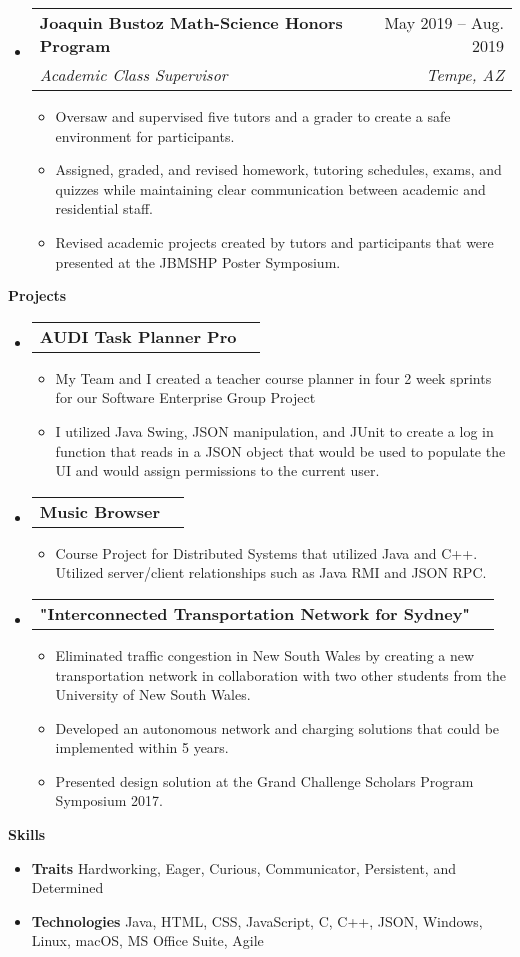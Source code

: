 \documentclass[letterpaper,12pt]{article}[leftmargin=*]
\makeatletter
\def \entryspacing {-0pt}
\renewcommand{\section}[2]{\vspace{5pt}
  \colorbox{secondary}{\color{white}\raggedbottom\normalsize\textbf{{#1}{\hspace{7pt}#2}}}
}
\newcommand{\resumeEntryStart}{\begin{itemize}[leftmargin=2.5mm]}
\newcommand{\resumeEntryEnd}{\end{itemize}\vspace{\entryspacing}}
\newcommand{\resumeItemListStart}{\begin{itemize}[leftmargin=4.5mm]}
\newcommand{\resumeItemListEnd}{\end{itemize}}
\newcommand{\resumeItem}[1]{
  \item\small{
    {#1 \vspace{-2pt}}
  }
}
\newcommand{\resumeEntryTSDL}[4]{
  \vspace{-1pt}\item[]
    \begin{tabularx}{0.97\textwidth}{X@{\hspace{60pt}}r}
      \textbf{\color{primary}#1} & {\firabook\color{accent}\small#2} \\
      \textit{\color{accent}\small#3} & \textit{\color{accent}\small#4} \\
    \end{tabularx}\vspace{-6pt}
}
\newcommand{\resumeEntryTD}[2]{
  \vspace{-1pt}\item[]
    \begin{tabularx}{0.97\textwidth}{X@{\hspace{60pt}}r}
      \textbf{\color{primary}#1} & {\firabook\color{accent}\small#2} \\
    \end{tabularx}\vspace{-6pt}
}
\newcommand{\resumeEntryS}[2]{
  \item[]\small{
    \textbf{\color{primary}#1 }{ #2 \vspace{-6pt}}
  }
}
\makeatother
\begin{document}
  \resumeEntryStart
    \resumeEntryTSDL
      {Joaquin Bustoz Math-Science Honors Program}{May 2019 -- Aug. 2019}
      {Academic Class Supervisor}{Tempe, AZ}
    \resumeItemListStart
      \resumeItem {Oversaw and supervised five tutors and a grader to create a safe environment for participants.}
      \resumeItem {Assigned, graded, and revised homework, tutoring schedules, exams, and quizzes while maintaining clear communication between academic and residential staff.}
      \resumeItem {Revised academic projects created by tutors and participants that were presented at the JBMSHP Poster Symposium.}
    \resumeItemListEnd
  \resumeEntryEnd


\section{\faFlask}{Projects}

  \resumeEntryStart
    \resumeEntryTD
      {AUDI Task Planner Pro}{}
    \resumeItemListStart
      \resumeItem {My Team and I created a teacher course planner in four 2 week sprints  for our Software Enterprise Group Project }
      \resumeItem {I utilized Java Swing, JSON manipulation, and JUnit to create a log in function that reads in a JSON object that would be used to populate the UI and would assign permissions to the current user. }
    \resumeItemListEnd
  \resumeEntryEnd

  \resumeEntryStart
    \resumeEntryTD
      {Music Browser}{}
    \resumeItemListStart
      \resumeItem {Course Project for Distributed Systems that utilized Java and C++. Utilized server/client relationships such as Java RMI and JSON RPC. }
    \resumeItemListEnd
  \resumeEntryEnd

  \resumeEntryStart
    \resumeEntryTD
      {"Interconnected Transportation Network for Sydney"}{}
    \resumeItemListStart
      \resumeItem {Eliminated traffic congestion in New South Wales by creating a new transportation network in collaboration with two other students from the University of New South Wales.}
            \resumeItem {Developed an autonomous network and charging solutions that could be implemented within 5 years.}
                  \resumeItem {Presented design solution at the Grand Challenge Scholars Program Symposium 2017.}
    \resumeItemListEnd
  \resumeEntryEnd

\section{\faGears}{Skills}
 \resumeEntryStart
  \resumeEntryS{Traits } {Hardworking, Eager, Curious, Communicator, Persistent,  and Determined }
  \resumeEntryS{Technologies } {Java, HTML, CSS, JavaScript, C, C++, JSON,  Windows, Linux, macOS, MS Office Suite, Agile}
 \resumeEntryEnd
\end{document}

